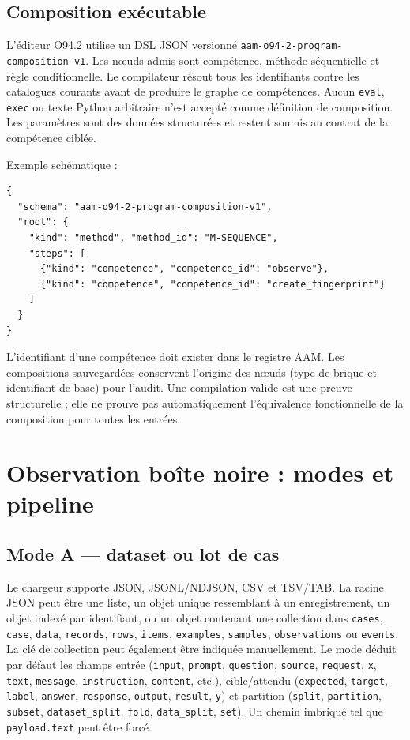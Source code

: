 \documentclass[11pt,a4paper]{article}
\begin{document}
\subsection{Composition exécutable}
L'éditeur O94.2 utilise un DSL JSON versionné \verb|aam-o94-2-program-composition-v1|. Les nœuds admis sont compétence, méthode séquentielle et règle conditionnelle. Le compilateur résout tous les identifiants contre les catalogues courants avant de produire le graphe de compétences. Aucun \verb|eval|, \verb|exec| ou texte Python arbitraire n'est accepté comme définition de composition. Les paramètres sont des données structurées et restent soumis au contrat de la compétence ciblée.

Exemple schématique :
\begin{verbatim}
{
  "schema": "aam-o94-2-program-composition-v1",
  "root": {
    "kind": "method", "method_id": "M-SEQUENCE",
    "steps": [
      {"kind": "competence", "competence_id": "observe"},
      {"kind": "competence", "competence_id": "create_fingerprint"}
    ]
  }
}
\end{verbatim}
L'identifiant d'une compétence doit exister dans le registre AAM. Les compositions sauvegardées conservent l'origine des nœuds (type de brique et identifiant de base) pour l'audit. Une compilation valide est une preuve structurelle ; elle ne prouve pas automatiquement l'équivalence fonctionnelle de la composition pour toutes les entrées.

\section{Observation boîte noire : modes et pipeline}
\subsection{Mode A — dataset ou lot de cas}
Le chargeur supporte JSON, JSONL/NDJSON, CSV et TSV/TAB. La racine JSON peut être une liste, un objet unique ressemblant à un enregistrement, un objet indexé par identifiant, ou un objet contenant une collection dans \verb|cases|, \verb|case|, \verb|data|, \verb|records|, \verb|rows|, \verb|items|, \verb|examples|, \verb|samples|, \verb|observations| ou \verb|events|. La clé de collection peut également être indiquée manuellement. Le mode déduit par défaut les champs entrée (\verb|input|, \verb|prompt|, \verb|question|, \verb|source|, \verb|request|, \verb|x|, \verb|text|, \verb|message|, \verb|instruction|, \verb|content|, etc.), cible/attendu (\verb|expected|, \verb|target|, \verb|label|, \verb|answer|, \verb|response|, \verb|output|, \verb|result|, \verb|y|) et partition (\verb|split|, \verb|partition|, \verb|subset|, \verb|dataset_split|, \verb|fold|, \verb|data_split|, \verb|set|). Un chemin imbriqué tel que \verb|payload.text| peut être forcé.
\end{document}
